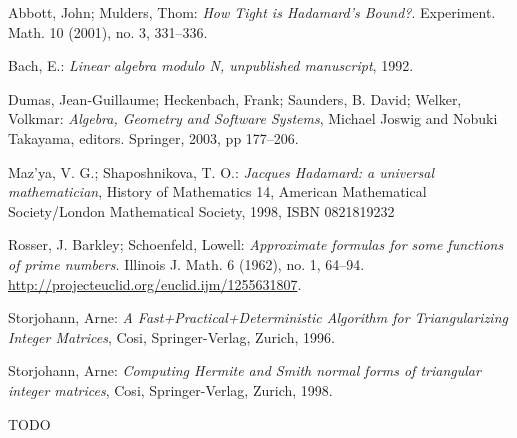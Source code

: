 \begin{thebibliography}{10}

Abbott, John; Mulders, Thom: \textit{How Tight is Hadamard's Bound?}.
Experiment. Math. 10 (2001), no. 3, 331--336.

Bach, E.: \textit{Linear algebra modulo N, unpublished manuscript}, 1992.

Dumas, Jean-Guillaume; Heckenbach, Frank; Saunders, B. David; Welker, Volkmar:
\textit{Algebra, Geometry and Software Systems}, Michael Joswig and Nobuki Takayama, editors. Springer, 2003, pp 177--206.

Maz'ya, V. G.; Shaposhnikova, T. O.: \textit{Jacques Hadamard: a universal mathematician},
History of Mathematics 14, American Mathematical Society/London Mathematical Society, 1998, ISBN 0821819232

Rosser, J. Barkley; Schoenfeld, Lowell: \textit{Approximate formulas for some functions of prime numbers.}
Illinois J. Math. 6 (1962), no. 1, 64--94. \url{http://projecteuclid.org/euclid.ijm/1255631807}.

Storjohann, Arne: \textit{A Fast+Practical+Deterministic Algorithm for Triangularizing Integer Matrices},
Cosi, Springer-Verlag, Zurich, 1996.

Storjohann, Arne: \textit{Computing Hermite and Smith normal forms
of triangular integer matrices},
Cosi, Springer-Verlag, Zurich, 1998.

TODO





\end{thebibliography}

\cleardoublepage
